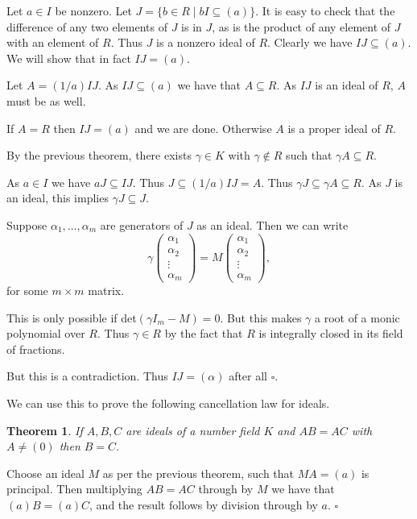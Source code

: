 \documentclass[10pt]{article}
\newcommand{\qed}{\square}
\newtheorem{theorem}{Theorem}[section]
\newenvironment{proof}[1][Proof]{\begin{trivlist}
\item[\hskip \labelsep {\bfseries #1}]}{\end{trivlist}}
\begin{document}
\begin{proof}
Let $a \in I$ be nonzero. Let $J = \{b \in R \;|\; bI \subseteq (a)\}$. It is easy to check that the difference of any two elements of $J$ is in $J$, as is the product of any element of $J$ with an element of $R$. Thus $J$ is a nonzero ideal of $R$. Clearly we have $IJ \subseteq (a)$. We will show that in fact $IJ = (a)$.

Let $A = (1/a)IJ$. As $IJ \subseteq (a)$ we have that $A \subseteq R$. As $IJ$ is an ideal of $R$, $A$ must be as well.

If $A = R$ then $IJ = (a)$ and we are done. Otherwise $A$ is a proper ideal of $R$.

By the previous theorem, there exists $\gamma \in K$ with $\gamma \notin R$ such that $\gamma A \subseteq R$. 

As $a \in I$ we have $aJ \subseteq IJ$. Thus $J \subseteq (1/a)IJ = A$. Thus $\gamma J \subseteq \gamma A \subseteq R$. As $J$ is an ideal, this implies $\gamma J \subseteq J$.

Suppose $\alpha_1, \ldots, \alpha_m$ are generators of $J$ as an ideal. Then we can write
$$\gamma \left(\begin{array}{c}\alpha_1 \\ \alpha_2 \\ \vdots \\ \alpha_m\end{array}\right) = M\left(\begin{array}{c}\alpha_1 \\ \alpha_2 \\ \vdots \\ \alpha_m\end{array}\right),$$
for some $m\times m$ matrix.

This is only possible if det$(\gamma I_m - M) = 0$. But this makes $\gamma$ a root of a monic polynomial over $R$. Thus $\gamma \in R$ by the fact that $R$ is integrally closed in its field of fractions.

But this is a contradiction. Thus $IJ = (\alpha)$ after all $\qed$. 
\end{proof}

We can use this to prove the following cancellation law for ideals.

\begin{theorem}\label{abaclab}
If $A, B, C$ are ideals of a number field $K$ and $AB = AC$ with $A \neq (0)$ then $B = C.$
\end{theorem}

\begin{proof}
Choose an ideal $M$ as per the previous theorem, such that $MA = (a)$ is principal. Then multiplying $AB = AC$ through by $M$ we have that $(a)B = (a)C$, and the result follows by division through by $a$. $\qed$
\end{proof}
\end{document}
